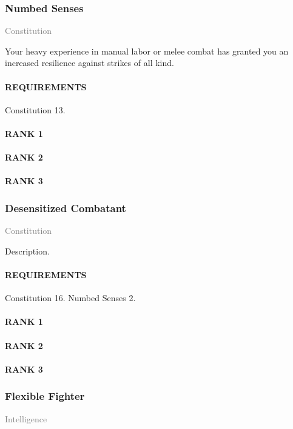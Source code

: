 \subsubsection{Numbed Senses} \label{feat::numbedsenses}
\small{\textcolor{gray}{Constitution}}

\normalsize
Your heavy experience in manual labor or melee combat has granted you an increased resilience against strikes of all kind.
\paragraph{REQUIREMENTS} Constitution 13.
\paragraph{RANK 1}
\paragraph{RANK 2}
\paragraph{RANK 3}

\subsubsection{Desensitized Combatant} \label{feat::desensitizedcombatant}
\small{\textcolor{gray}{Constitution}}

\normalsize
Description.
\paragraph{REQUIREMENTS} Constitution 16. Numbed Senses 2.
\paragraph{RANK 1}
\paragraph{RANK 2}
\paragraph{RANK 3}

\subsubsection{Flexible Fighter} \label{feat::flexiblefighter} %
\small{\textcolor{gray}{Intelligence}}

